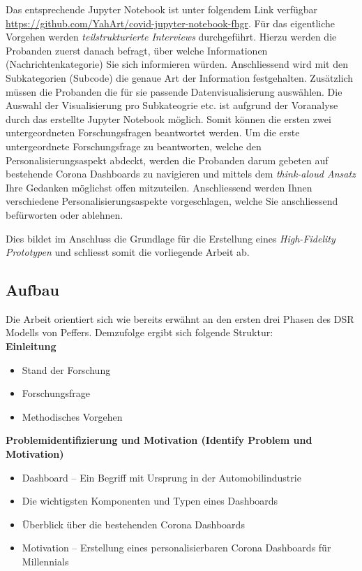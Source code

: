 \documentclass[12pt, oneside]{article}
\begin{document}
\clearpage
Das entsprechende Jupyter Notebook ist unter folgendem Link verfügbar \url{https://github.com/YahArt/covid-jupyter-notebook-fhgr}. Für das eigentliche Vorgehen werden \textit{teilstrukturierte Interviews} durchgeführt. Hierzu werden die Probanden zuerst danach befragt, über welche Informationen (Nachrichtenkategorie) Sie sich informieren würden. Anschliessend wird mit den Subkategorien (Subcode) die genaue Art der Information festgehalten. Zusätzlich müssen die Probanden die für sie passende Datenvisualisierung auswählen. Die Auswahl der Visualisierung pro Subkateogrie etc. ist aufgrund der Voranalyse durch das erstellte Jupyter Notebook möglich. Somit können die ersten zwei untergeordneten Forschungsfragen beantwortet werden. Um die erste untergeordnete Forschungsfrage zu beantworten, welche den Personalisierungsaspekt abdeckt, werden die Probanden darum gebeten auf bestehende Corona Dashboards zu navigieren und mittels dem \textit{think-aloud Ansatz} Ihre Gedanken möglichst offen mitzuteilen. Anschliessend werden Ihnen verschiedene Personalisierungsaspekte vorgeschlagen, welche Sie anschliessend befürworten oder ablehnen.

Dies bildet im Anschluss die Grundlage für die Erstellung eines \textit{High-Fidelity Prototypen} und schliesst somit die vorliegende Arbeit ab.


\clearpage
\subsection{Aufbau}
Die Arbeit orientiert sich wie bereits erwähnt an den ersten drei Phasen des DSR Modells von Peffers. Demzufolge ergibt sich folgende Struktur:\\

\textbf{Einleitung}
\begin{itemize}
    \item Stand der Forschung
    \item Forschungsfrage
    \item Methodisches Vorgehen\\
\end{itemize}


\textbf{Problemidentifizierung und Motivation (Identify Problem und Motivation)}
\begin{itemize}
    \item Dashboard – Ein Begriff mit Ursprung in der Automobilindustrie
    \item Die wichtigsten Komponenten und Typen eines Dashboards
    \item Überblick über die bestehenden Corona Dashboards
    \item Motivation – Erstellung eines personalisierbaren Corona Dashboards für Millennials\\
\end{itemize}
\end{document}

